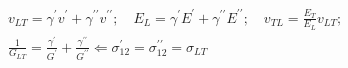 $$\begin{aligned}
& v_{L T}=\gamma^{\prime} v^{\prime}+\gamma^{\prime \prime} v^{\prime \prime} ; \quad E_L=\gamma^{\prime} E^{\prime}+\gamma^{\prime \prime} E^{\prime \prime} ; \quad v_{T L}=\frac{E_T}{E_L} v_{L T} ; \quad \\& \frac{1}{G_{L T}}=\frac{\gamma^{\prime}}{G^{\prime}}+\frac{\gamma^{\prime \prime}}{G^{\prime \prime}} \Leftarrow \sigma_{12}^{\prime}=\sigma_{12}^{\prime \prime}=\sigma_{L T} \\
&
\end{aligned}
$$

